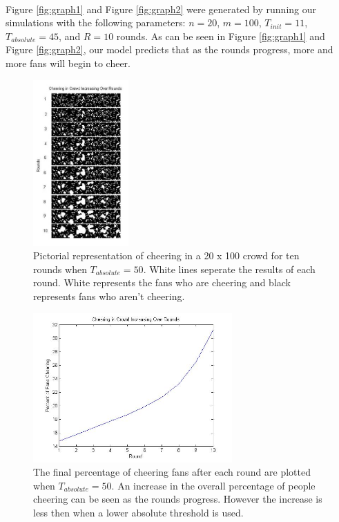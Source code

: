 \documentclass[oneside,12pt]{report}
\begin{document}
\paragraph{}
Figure \ref{fig:graph1} and Figure \ref{fig:graph2} were generated by running our simulations with the following parameters: $n=20$, $m=100$, $T_{init}=11$, $T_{absolute}=45$, and $R=10$ rounds. As can be seen in Figure \ref{fig:graph1} and Figure \ref{fig:graph2}, our model predicts that as the rounds progress, more and more fans will begin to cheer. 

\begin{figure}[h]
    \begin{center}
        \includegraphics[height=2.5in]{sample_graph3.jpg}
    \end{center}
    \caption[Pictorial representation of cheering with a higher absolute threshold.]{Pictorial representation of cheering in a 20 x 100 crowd for ten rounds when $T_{absolute}=50$. White lines seperate the results of each round. White represents the fans who are cheering and black represents fans who aren't cheering.}
    \label{fig:graph3}
\end{figure}

\begin{figure}[h]
    \begin{center}
        \includegraphics[width=3in]{sample_graph4.jpg}
    \end{center}
    \caption[Plot of cheering levels over time in a simulated crowd with a higher absolute threshold.]{The final percentage of cheering fans after each round are plotted when $T_{absolute}=50$. An increase in the overall percentage of people cheering can be seen as the rounds progress. However the increase is less then when a lower absolute threshold is used.}
    \label{fig:graph4}
\end{figure}
\end{document}
